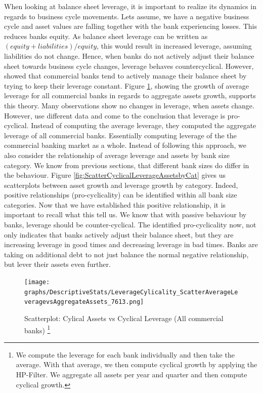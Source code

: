 \documentclass[12pt, a4paper]{article} %
\begin{document}
When looking at balance sheet leverage, it is important to realize its dynamics in regards to business cycle movements.
Lets assume, we have a negative business cycle and asset values are falling together with the bank experiencing losses. This reduces banks equity. As balance sheet leverage can be written as $(equity + liabilities)/equity$, this would result in increased leverage, assuming liabilities do not change. Hence, when banks do not actively adjust their balance sheet towards business cycle changes, leverage behaves countercyclical. However, \cite{AdrianShin2010} showed that commercial banks tend to actively manage their balance sheet by trying to keep their leverage constant. Figure \ref{fig:ScatterCyclicalLeverageAssets}, showing the growth of average leverage for all commercial banks in regards to aggregate assets growth, supports this theory. Many observations show no changes in leverage, when assets change. However, \cite{AdrianShin2011} use different data and come to the conclusion that leverage is pro-cyclical. Instead of computing the average leverage, they computed the aggregate leverage of all commercial banks. Essentially computing leverage of the the commercial banking market as a whole. Instead of following this approach, we also consider the relationship of average leverage and assets by bank size category. We know from previous sections, that different bank sizes do differ in the behaviour. Figure \ref{fig:ScatterCyclicalLeverageAssetsbyCat} gives us scatterplots between asset growth and leverage growth by category. Indeed, positive relationships (pro-cyclicality) can be identified within all bank size categories. 
Now that we have established this positive relationship, it is important to recall what this tell us. We know that with passive behaviour by banks, leverage should be counter-cyclical. The identified pro-cyclicality now, not only indicates that banks actively adjust their balance sheet, but they are increasing leverage in good times and decreasing leverage in bad times. Banks are taking on additional debt to not just balance the normal negative relationship, but lever their assets even further.


\begin{figure}[H]
\begin{minipage}{\textwidth}
\centering
\caption[1]{Scatterplot: Cylical Assets vs Cyclical Leverage (All commercial banks) \footnote{We compute the leverage for each bank individually and then take the average. With that average, we then compute cyclical growth by applying the HP-Filter. We aggregate all assets per year and quarter and then compute cyclical growth.}}
\texttt{[image: graphs/DescriptiveStats/LeverageCylicality\_ScatterAverageLeveragevsAggregateAssets\_7613.png]}
\label{fig:ScatterCyclicalLeverageAssets}
\end{minipage}
\end{figure}
\end{document}

